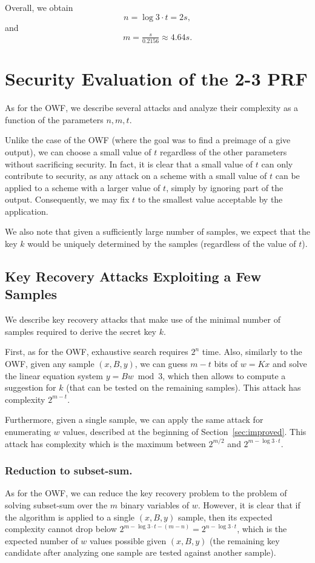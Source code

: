 \documentclass[orivec,envcountsect]{llncs}
\begin{document}
Overall, we obtain
$$n = \log 3 \cdot t = 2s,$$
and $$m = \tfrac{s}{0.2156} \approx 4.64 s.$$




\section{Security Evaluation of the 2-3 PRF}
\label{sec:basicprf}

As for the OWF, we describe several attacks and analyze their complexity as a function of the parameters $n,m,t$.

Unlike the case of the OWF (where the goal was to find a preimage of a give output),
we can choose a small value of $t$ regardless of the other parameters without sacrificing security. In fact, it is clear that a small value of $t$ can only contribute to security, as any attack on a scheme with a small value of $t$ can be applied to a scheme with a larger value of $t$, simply by ignoring part of the output. Consequently, we may fix $t$ to the smallest value acceptable by the application.

We also note that given a sufficiently large number of samples, we expect that the key $k$ would be uniquely determined by the samples (regardless of the value of $t$).

\subsection{Key Recovery Attacks Exploiting a Few Samples}
We describe key recovery attacks that make use of the minimal number of samples required to derive the secret key $k$.

First, as for the OWF, exhaustive search requires $2^{n}$ time. Also,
similarly to the OWF, given any sample $(x,B,y)$, we can guess $m - t$ bits of $w = K x$ and solve the linear equation system $y = B w \bmod 3$, which then allows to compute a suggestion for $k$ (that can be tested on the remaining samples). This attack has complexity $2^{m-t}$.

Furthermore, given a single sample, we can apply the same attack for enumerating $w$ values,
described at the beginning of Section~\ref{sec:improved}. This attack has complexity which is the maximum between $2^{m/2}$ and $2^{m - \log 3 \cdot t}$.

\subsubsection{Reduction to subset-sum.}
As for the OWF, we can reduce the key recovery problem to the problem of solving subset-sum over the $m$ binary variables of $w$. However, it is clear that if the algorithm is applied to a single $(x,B,y)$ sample, then its expected complexity cannot drop below $2^{m - \log 3 \cdot t - (m -n)} = 2^{n - \log 3 \cdot t}$, which is the expected number of $w$ values possible given $(x,B,y)$
(the remaining key candidate after analyzing one sample are tested against another sample).
\end{document}
